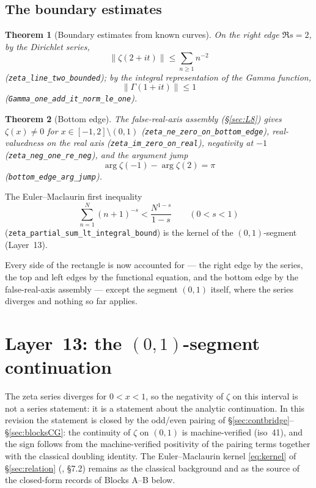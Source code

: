 \documentclass{article}
\newtheorem{theorem}{Theorem}[section]
\newcommand{\GG}{\Gamma}
\newcommand{\zt}{\zeta}
\begin{document}
\subsection{The boundary estimates}
\label{sec:boundary}

\begin{theorem}[Boundary estimates from known curves]
\label{thm:boundary}
On the right edge $\Re s=2$, by the Dirichlet series,
\[
\|\zt(2+it)\|\le \sum_{n\ge 1}n^{-2}
\]
(\texttt{zeta\_line\_two\_bounded}); by the integral representation of the
Gamma function,
\[
\|\GG(1+it)\|\le 1
\]
(\texttt{Gamma\_one\_add\_it\_norm\_le\_one}).
\end{theorem}

\begin{theorem}[Bottom edge]
\label{thm:bottom}
The false-real-axis assembly (\S\ref{sec:L8}) gives $\zt(x)\neq 0$ for
$x\in[-1,2]\setminus(0,1)$ (\texttt{zeta\_ne\_zero\_on\_bottom\_edge}),
real-valuedness on the real axis (\texttt{zeta\_im\_zero\_on\_real}),
negativity at $-1$ (\texttt{zeta\_neg\_one\_re\_neg}), and the argument
jump
\[
\arg\zt(-1)-\arg\zt(2)=\pi
\]
(\texttt{bottom\_edge\_arg\_jump}).
\end{theorem}

The Euler--Maclaurin first inequality
\[
\sum_{n=1}^{N}(n+1)^{-s}<\frac{N^{1-s}}{1-s}\qquad(0<s<1)
\]
(\texttt{zeta\_partial\_sum\_lt\_integral\_bound}) is the kernel of the
$(0,1)$-segment (Layer~13).

Every side of the rectangle is now accounted for --- the right edge by
the series, the top and left edges by the functional equation, and the
bottom edge by the false-real-axis assembly --- except the segment
$(0,1)$ itself, where the series diverges and nothing so far applies.

\section{Layer~13: the $(0,1)$-segment continuation}
\label{sec:kernel}

The zeta series diverges for $0<x<1$, so the negativity of $\zt$ on this
interval is not a series statement: it is a statement about the analytic
continuation. In this revision the statement is closed by the odd/even
pairing of \S\ref{sec:contbridge}--\S\ref{sec:blocksCG}: the continuity of
$\zt$ on $(0,1)$ is machine-verified (iso~41), and the sign follows from
the machine-verified positivity of the pairing terms together with the
classical doubling identity. The Euler--Maclaurin kernel
\eqref{eq:kernel} of \S\ref{sec:relation} (\cite{whittaker}, \S7.2)
remains as the classical background and as the source of the closed-form
records of Blocks A--B below.
\end{document}
